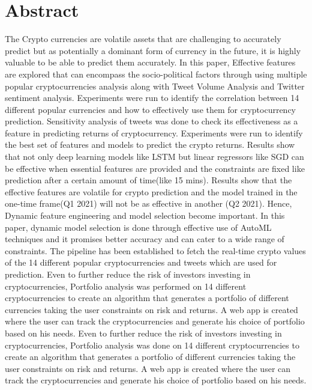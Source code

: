 \documentclass[final]{cvpr}
\begin{document}
\section{Abstract}
The Crypto currencies are volatile assets that are challenging to accurately predict but as potentially a dominant form of currency in the future, it is highly valuable to be able to predict them accurately. In this paper, Effective features are explored that can encompass the socio-political factors through using multiple popular cryptocurrencies analysis along with Tweet Volume Analysis and Twitter sentiment analysis. Experiments were run to identify the correlation between 14 different popular currencies and how to effectively use them for cryptocurrency prediction. Sensitivity analysis of tweets was done to check its effectiveness as a feature in predicting returns of cryptocurrency. Experiments were run to identify the best set of features and models to predict the crypto returns. Results show that not only deep learning models like LSTM but linear regressors like SGD can be effective when essential features are provided and the constraints are fixed like prediction after a certain amount of time(like 15 mins). Results show that the effective features are volatile for crypto prediction and the model trained in the one-time frame(Q1 2021) will not be as effective in another (Q2 2021). Hence, Dynamic feature engineering and model selection become important. In this paper, dynamic model selection is done through effective use of AutoML techniques and it promises better accuracy and can cater to a wide range of constraints. The pipeline has been established to fetch the real-time crypto values of the 14 different popular cryptocurrencies and tweets which are used for prediction. Even to further reduce the risk of investors investing in cryptocurrencies, Portfolio analysis was performed on 14 different cryptocurrencies to create an algorithm that generates a portfolio of different currencies taking the user constraints on risk and returns. A web app is created where the user can track the cryptocurrencies and generate his choice of portfolio based on his needs. Even to further reduce the risk of investors investing in cryptocurrencies, Portfolio analysis was done on 14 different cryptocurrencies to create an algorithm that generates a portfolio of different currencies taking the user constraints on risk and returns. A web app is created where the user can track the cryptocurrencies and generate his choice of portfolio based on his needs.
\end{document}
